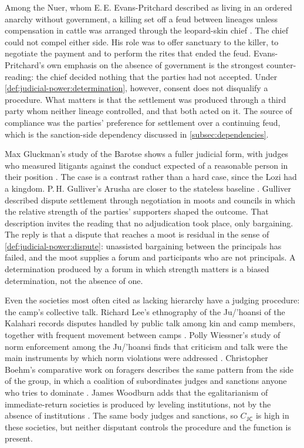 \documentclass[11pt,letterpaper]{article}
\theoremstyle{definition}
\theoremstyle{remark}
\newcommand{\pJ}{\mathsf{J}}
\newcommand{\pC}{\mathsf{C}}
\begin{document}
Among the Nuer, whom E.\,E. Evans-Pritchard described as living in an ordered anarchy without government, a killing set off a feud between lineages unless compensation in cattle was arranged through the leopard-skin chief \citep{evanspritchard1940}. The chief could not compel either side. His role was to offer sanctuary to the killer, to negotiate the payment and to perform the rites that ended the feud. Evans-Pritchard's own emphasis on the absence of government is the strongest counter-reading: the chief decided nothing that the parties had not accepted. Under \cref{def:judicial-power:determination}, however, consent does not disqualify a procedure. What matters is that the settlement was produced through a third party whom neither lineage controlled, and that both acted on it. The source of compliance was the parties' preference for settlement over a continuing feud, which is the sanction-side dependency discussed in \cref{subsec:dependencies}.

Max Gluckman's study of the Barotse shows a fuller judicial form, with judges who measured litigants against the conduct expected of a reasonable person in their position \citep{gluckman1955}. The case is a contrast rather than a hard case, since the Lozi had a kingdom. P.\,H. Gulliver's Arusha are closer to the stateless baseline \citep{gulliver1963}. Gulliver described dispute settlement through negotiation in moots and councils in which the relative strength of the parties' supporters shaped the outcome. That description invites the reading that no adjudication took place, only bargaining. The reply is that a dispute that reaches a moot is residual in the sense of \cref{def:judicial-power:dispute}: unassisted bargaining between the principals has failed, and the moot supplies a forum and participants who are not principals. A determination produced by a forum in which strength matters is a biased determination, not the absence of one.

Even the societies most often cited as lacking hierarchy have a judging procedure: the camp's collective talk. Richard Lee's ethnography of the Ju/'hoansi of the Kalahari records disputes handled by public talk among kin and camp members, together with frequent movement between camps \citep{lee2013}. Polly Wiessner's study of norm enforcement among the Ju/'hoansi finds that criticism and talk were the main instruments by which norm violations were addressed \citep{wiessner2005}. Christopher Boehm's comparative work on foragers describes the same pattern from the side of the group, in which a coalition of subordinates judges and sanctions anyone who tries to dominate \citep{boehm1999}. James Woodburn adds that the egalitarianism of immediate-return societies is produced by leveling institutions, not by the absence of institutions \citep{woodburn1982}. The same body judges and sanctions, so $C_{\pJ\pC}$ is high in these societies, but neither disputant controls the procedure and the function is present.
\end{document}
